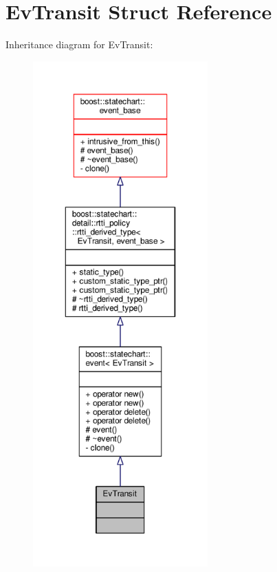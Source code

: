 \hypertarget{struct_ev_transit}{}\section{Ev\+Transit Struct Reference}
\label{struct_ev_transit}


Inheritance diagram for Ev\+Transit\+:
\nopagebreak
\begin{figure}[H]
\begin{center}
\leavevmode
\includegraphics[height=550pt]{struct_ev_transit__inherit__graph}
\end{center}
\end{figure}


